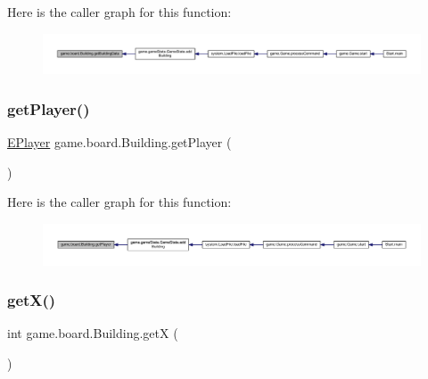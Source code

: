 Here is the caller graph for this function\+:
\nopagebreak
\begin{figure}[H]
\begin{center}
\leavevmode
\includegraphics[width=350pt]{classgame_1_1board_1_1_building_a270e3f351d616701d68b776b054a1b63_icgraph}
\end{center}
\end{figure}
\mbox{\label{classgame_1_1board_1_1_building_a68a617688a9b58a7534c5e32afeb478f}} 
\subsubsection{\texorpdfstring{get\+Player()}{getPlayer()}}
{\footnotesize\ttfamily \mbox{\hyperlink{enumgame_1_1_e_player}{E\+Player}} game.\+board.\+Building.\+get\+Player (\begin{DoxyParamCaption}{ }\end{DoxyParamCaption})\hspace{0.3cm}{\ttfamily [inline]}}

Here is the caller graph for this function\+:
\nopagebreak
\begin{figure}[H]
\begin{center}
\leavevmode
\includegraphics[width=350pt]{classgame_1_1board_1_1_building_a68a617688a9b58a7534c5e32afeb478f_icgraph}
\end{center}
\end{figure}
\mbox{\label{classgame_1_1board_1_1_building_a4b3b28df2d7385677d3f2d08d06797bd}} 
\subsubsection{\texorpdfstring{get\+X()}{getX()}}
{\footnotesize\ttfamily int game.\+board.\+Building.\+getX (\begin{DoxyParamCaption}{ }\end{DoxyParamCaption})\hspace{0.3cm}{\ttfamily [inline]}}

